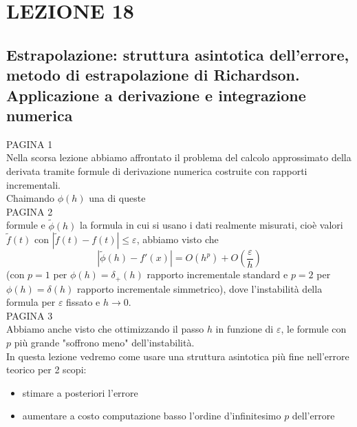 \documentclass[12pt,a4paper]{article}
\begin{document}
\section*{LEZIONE 18}
\subsection*{Estrapolazione: struttura asintotica dell'errore, metodo di estrapolazione di Richardson. Applicazione a derivazione e integrazione numerica}

PAGINA 1\\%
Nella scorsa lezione abbiamo affrontato il problema del calcolo approssimato della derivata tramite formule di derivazione numerica costruite con rapporti incrementali.\\Chaimando $\phi(h)$ una di queste\\

PAGINA 2\\%
formule e $\tilde{\phi}(h)$ la formula in cui si usano i dati realmente misurati, cioè valori $\tilde{f}(t)$ con $|\tilde{f}(t)-f(t)|\leq\varepsilon$, abbiamo visto che
\begin{equation*}
    |\tilde{\phi}(h)-f'(x)|=O(h^p)+O(\frac{\varepsilon}{h})
\end{equation*}
(con $p=1$ per $\phi(h)=\delta_+(h)$ rapporto incrementale standard e $p=2$ per $\phi(h)=\delta(h)$ rapporto incrementale simmetrico), dove l'instabilità della formula per $\varepsilon$ fissato e $h\rightarrow0$.\\

PAGINA 3\\%
Abbiamo anche visto che ottimizzando il passo $h$ in funzione di $\varepsilon$, le formule con $p$ più grande "soffrono meno" dell'instabilità. \\In questa lezione vedremo come usare una struttura asintotica più fine nell'errore teorico per 2 scopi:
\begin{itemize}
    \item stimare a posteriori l'errore
    \item aumentare a costo computazione basso l'ordine d'infinitesimo $p$ dell'errore
\end{itemize}
\end{document}
